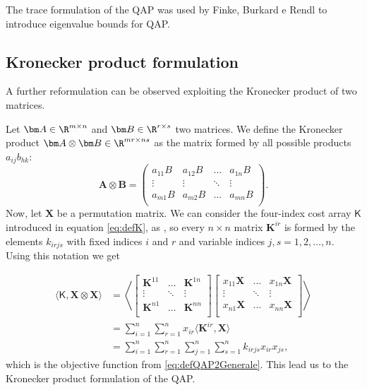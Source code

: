 The trace formulation of the QAP was used by Finke, Burkard e Rendl \cite{Finke1987} to introduce eigenvalue bounds for QAP.


\subsection{Kronecker product formulation}
A further reformulation can be observed exploiting the Kronecker product of two matrices.
\begin{defi}
	Let $\bm A \in \R^{m \times n}$ and $\bm B \in \R^{r \times s}$ two matrices. We define the Kronecker product $\bm A \otimes \bm B \in \R^{mr \times ns}$ as the matrix formed by all possible products $a_{ij}b_{hk}$:
\[
\bm A \otimes \bm B = \begin{pmatrix}
a_{11}B & a_{12} B & \dots & a_{1n}B \\
\vdots & \vdots & \ddots & \vdots \\
a_{m1}B& a_{m2}B & \dots & a_{mn}B \\
\end{pmatrix}.
\]	
Now, let $\bm X$ be a permutation matrix. We can consider the four-index cost array $\mathsf K$ introduced in equation \eqref{eq:defK}, as , so every $n \times n$ matrix $\bm K^{ir}$ is formed by the elements $k_{irjs}$	with fixed indices $i$ and $r$ and variable indices $j,s = 1,2,\dots,n$. Using this notation we get

\[
\begin{split}
\langle \mathsf K, \bm X \otimes \bm X \rangle &=\left\langle \begin{bmatrix}
\bm K^{11} & \dots &\bm  K^{1n} \\
\vdots & \ddots & \vdots \\
\bm K^{n1} & \dots & \bm K^{nn} \\
\end{bmatrix}
\begin{bmatrix}
x_{11}\bm X &\dots &x_{1n}\bm X \\
\vdots & \ddots & \vdots \\
x_{n1}\bm X & \dots & x_{nn}\bm X \\
\end{bmatrix}\right\rangle \\
&=\sum_{i=1}^n\sum_{r=1}^n x_{ir}\langle \bm K^{ir},\bm X  \rangle \\
&=\sum_{i=1}^n\sum_{r=1}^n \sum_{j=1}^n\sum_{s=1}^n k_{irjs}x_{ir}x_{js},
\end{split}
\]
which is the objective function from \eqref{eq:defQAP2Generale}.
	This lead us to the Kronecker product formulation of the QAP.
	

\end{defi}
